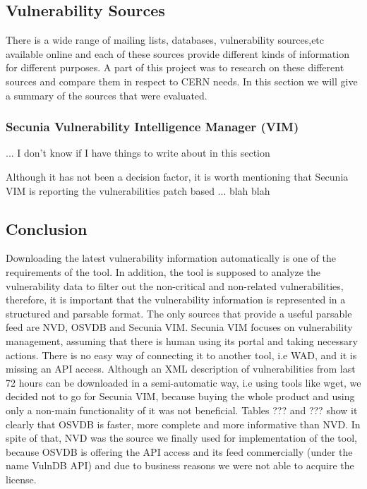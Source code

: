 \subsection{Vulnerability Sources}

There is a wide range of mailing lists, databases, vulnerability sources,etc  available online and each of these sources provide different kinds of information for different purposes. A part of this project was to research on these different sources and compare them in respect to CERN needs. In this section we will give a summary of the sources that were evaluated. 
 
\subsubsection{Secunia Vulnerability Intelligence Manager (VIM)} 



...
I don't know if I have things to write about in this section

Although it has not been a decision factor, it is worth mentioning that Secunia VIM is reporting the vulnerabilities patch based ... blah blah 
\subsection{Conclusion}
Downloading the latest vulnerability information automatically is one of the requirements of the tool. In addition, the tool is supposed to analyze the vulnerability data to filter out the non-critical and non-related vulnerabilities, therefore, it is important that the vulnerability information is represented in a structured and parsable format. 
The only sources that provide a useful parsable feed are NVD, OSVDB and Secunia VIM. Secunia VIM focuses on vulnerability management, assuming that there is human using its portal and taking necessary actions. There is no easy way of connecting it to another tool, i.e WAD, and it is missing an API access. Although an XML description of vulnerabilities from last 72 hours can be downloaded in a semi-automatic way, i.e using tools like wget, we decided not to go for Secunia VIM, because buying the whole product and using only a non-main functionality of it was not beneficial.
Tables ??? and ??? show it clearly that OSVDB is faster, more complete and more informative than NVD. In spite of that, NVD was the source we finally used for implementation of the tool, because OSVDB is offering the API access and its feed commercially (under the name VulnDB API) and due to business reasons we were not able to acquire the license. 

